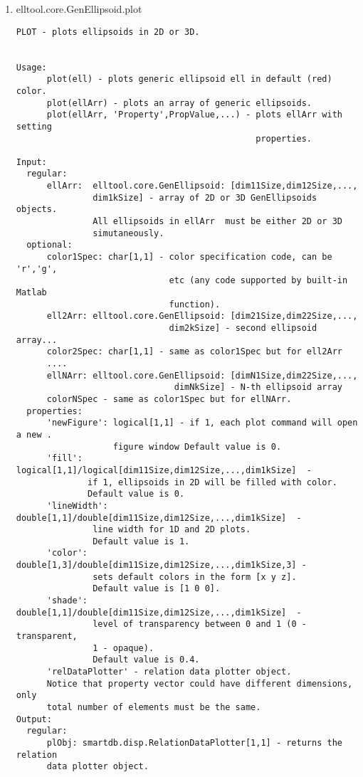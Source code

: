 \begin{enumerate}
\begin{lstlisting}
\end{lstlisting}
\fontfamily{\familydefault}
\selectfont
\item {elltool.core.GenEllipsoid.plot}
\selectfont
\begin{lstlisting}
PLOT - plots ellipsoids in 2D or 3D.


Usage:
      plot(ell) - plots generic ellipsoid ell in default (red) color.
      plot(ellArr) - plots an array of generic ellipsoids.
      plot(ellArr, 'Property',PropValue,...) - plots ellArr with setting
                                               properties.

Input:
  regular:
      ellArr:  elltool.core.GenEllipsoid: [dim11Size,dim12Size,...,
               dim1kSize] - array of 2D or 3D GenEllipsoids objects.
               All ellipsoids in ellArr  must be either 2D or 3D
               simutaneously.
  optional:
      color1Spec: char[1,1] - color specification code, can be 'r','g',
                              etc (any code supported by built-in Matlab
                              function).
      ell2Arr: elltool.core.GenEllipsoid: [dim21Size,dim22Size,...,
                              dim2kSize] - second ellipsoid array...
      color2Spec: char[1,1] - same as color1Spec but for ell2Arr
      ....
      ellNArr: elltool.core.GenEllipsoid: [dimN1Size,dim22Size,...,
                               dimNkSize] - N-th ellipsoid array
      colorNSpec - same as color1Spec but for ellNArr.
  properties:
      'newFigure': logical[1,1] - if 1, each plot command will open a new .
                   figure window Default value is 0.
      'fill': logical[1,1]/logical[dim11Size,dim12Size,...,dim1kSize]  -
              if 1, ellipsoids in 2D will be filled with color.
              Default value is 0.
      'lineWidth': double[1,1]/double[dim11Size,dim12Size,...,dim1kSize]  -
               line width for 1D and 2D plots.
               Default value is 1.
      'color': double[1,3]/double[dim11Size,dim12Size,...,dim1kSize,3] -
               sets default colors in the form [x y z].
               Default value is [1 0 0].
      'shade': double[1,1]/double[dim11Size,dim12Size,...,dim1kSize]  -
               level of transparency between 0 and 1 (0 - transparent,
               1 - opaque).
               Default value is 0.4.
      'relDataPlotter' - relation data plotter object.
      Notice that property vector could have different dimensions, only
      total number of elements must be the same.
Output:
  regular:
      plObj: smartdb.disp.RelationDataPlotter[1,1] - returns the relation
      data plotter object.


\end{lstlisting}
\end{enumerate}
